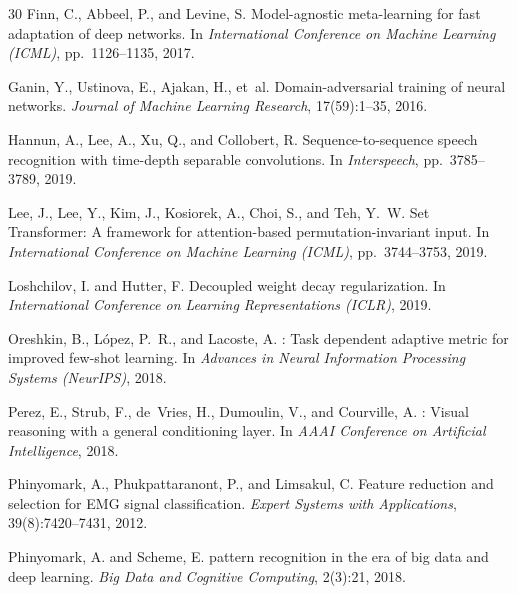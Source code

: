 \documentclass[10pt]{article}
\begin{document}
\begin{thebibliography}{30}
Finn, C., Abbeel, P., and Levine, S.
\newblock Model-agnostic meta-learning for fast adaptation of deep networks.
\newblock In \emph{International Conference on Machine Learning (ICML)}, pp.\ 1126--1135, 2017.

Ganin, Y., Ustinova, E., Ajakan, H., et~al.
\newblock Domain-adversarial training of neural networks.
\newblock \emph{Journal of Machine Learning Research}, 17(59):1--35, 2016.

Hannun, A., Lee, A., Xu, Q., and Collobert, R.
\newblock Sequence-to-sequence speech recognition with time-depth separable convolutions.
\newblock In \emph{Interspeech}, pp.\ 3785--3789, 2019.

Lee, J., Lee, Y., Kim, J., Kosiorek, A., Choi, S., and Teh, Y.~W.
\newblock Set Transformer: A framework for attention-based permutation-invariant input.
\newblock In \emph{International Conference on Machine Learning (ICML)}, pp.\ 3744--3753, 2019.

Loshchilov, I. and Hutter, F.
\newblock Decoupled weight decay regularization.
\newblock In \emph{International Conference on Learning Representations (ICLR)}, 2019.

Oreshkin, B., L{\'o}pez, P.~R., and Lacoste, A.
: Task dependent adaptive metric for improved few-shot learning.
\newblock In \emph{Advances in Neural Information Processing Systems (NeurIPS)}, 2018.

Perez, E., Strub, F., de~Vries, H., Dumoulin, V., and Courville, A.
: Visual reasoning with a general conditioning layer.
\newblock In \emph{AAAI Conference on Artificial Intelligence}, 2018.

Phinyomark, A., Phukpattaranont, P., and Limsakul, C.
\newblock Feature reduction and selection for {EMG} signal classification.
\newblock \emph{Expert Systems with Applications}, 39(8):7420--7431, 2012.

Phinyomark, A. and Scheme, E.
 pattern recognition in the era of big data and deep learning.
\newblock \emph{Big Data and Cognitive Computing}, 2(3):21, 2018.


\end{thebibliography}
\end{document}
